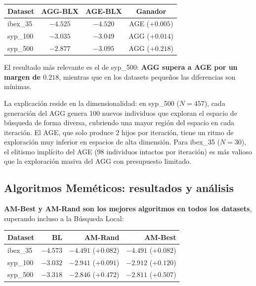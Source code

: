 \documentclass[12pt,a4paper]{article}
\begin{document}
\begin{center}
\begin{tabular}{lcc|c}
\toprule
\textbf{Dataset} & \textbf{AGG-BLX} & \textbf{AGE-BLX} & \textbf{Ganador} \\
\midrule
ibex\_35  & $-4.525$ & $-4.520$ & AGE ($+0.005$) \\
syp\_100  & $-3.035$ & $-3.049$ & AGG ($+0.014$) \\
syp\_500  & $-2.877$ & $-3.095$ & AGG ($+0.218$) \\
\bottomrule
\end{tabular}
\end{center}

El resultado más relevante es el de syp\_500: \textbf{AGG supera a AGE por un margen de
$0.218$}, mientras que en los datasets pequeños las diferencias son mínimas.

La explicación reside en la dimensionalidad: en syp\_500 ($N=457$), cada generación del
AGG genera 100 nuevos individuos que exploran el espacio de búsqueda de forma diversa,
cubriendo una mayor región del espacio en cada iteración. El AGE, que solo produce 2
hijos por iteración, tiene un ritmo de exploración muy inferior en espacios de alta
dimensión. Para ibex\_35 ($N=30$), el elitismo implícito del AGE (98 individuos intactos
por iteración) es más valioso que la exploración masiva del AGG con presupuesto limitado.

\subsection{Algoritmos Meméticos: resultados y análisis}

\textbf{AM-Best y AM-Rand son los mejores algoritmos en todos los datasets}, superando
incluso a la Búsqueda Local:

\begin{center}
\begin{tabular}{lrrr}
\toprule
\textbf{Dataset} & \textbf{BL} & \textbf{AM-Rand} & \textbf{AM-Best} \\
\midrule
ibex\_35 & $-4.573$ & $-4.491$ ($+0.082$) & $-4.491$ ($+0.082$) \\
syp\_100 & $-3.032$ & $-2.941$ ($+0.091$) & $-2.912$ ($+0.120$) \\
syp\_500 & $-3.318$ & $-2.846$ ($+0.472$) & $-2.811$ ($+0.507$) \\
\bottomrule
\end{tabular}
\end{center}
\end{document}
